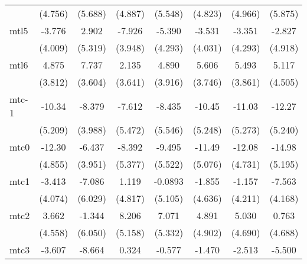 \documentclass{article}
\begin{document}
{\begin{longtable}{l*{7}{c}}
                &  (4.756)         &  (5.688)         &  (4.887)         &  (5.548)         &  (4.823)         &  (4.966)         &  (5.875)         \\
mtl5            &   -3.776         &    2.902         &   -7.926         &   -5.390         &   -3.531         &   -3.351         &   -2.827         \\
                &  (4.009)         &  (5.319)         &  (3.948)         &  (4.293)         &  (4.031)         &  (4.293)         &  (4.918)         \\
mtl6            &    4.875         &    7.737\sym{*}  &    2.135         &    4.890         &    5.606         &    5.493         &    5.117         \\
                &  (3.812)         &  (3.604)         &  (3.641)         &  (3.916)         &  (3.746)         &  (3.861)         &  (4.505)         \\
mtc-1           &   -10.34         &   -8.379\sym{*}  &   -7.612         &   -8.435         &   -10.45         &   -11.03\sym{*}  &   -12.27\sym{*}  \\
                &  (5.209)         &  (3.988)         &  (5.472)         &  (5.546)         &  (5.248)         &  (5.273)         &  (5.240)         \\
mtc0            &   -12.30\sym{*}  &   -6.437         &   -8.392         &   -9.495         &   -11.49\sym{*}  &   -12.08\sym{*}  &   -14.98\sym{**} \\
                &  (4.855)         &  (3.951)         &  (5.377)         &  (5.522)         &  (5.076)         &  (4.731)         &  (5.195)         \\
mtc1            &   -3.413         &   -7.086         &    1.119         &  -0.0893         &   -1.855         &   -1.157         &   -7.563         \\
                &  (4.074)         &  (6.029)         &  (4.817)         &  (5.105)         &  (4.636)         &  (4.211)         &  (4.168)         \\
mtc2            &    3.662         &   -1.344         &    8.206         &    7.071         &    4.891         &    5.030         &    0.763         \\
                &  (4.558)         &  (6.050)         &  (5.158)         &  (5.332)         &  (4.902)         &  (4.690)         &  (4.688)         \\
mtc3            &   -3.607         &   -8.664         &    0.324         &   -0.577         &   -1.470         &   -2.513         &   -5.500         \\

\end{longtable}}
\end{document}
